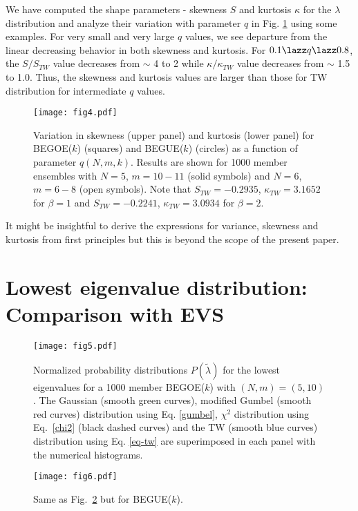 We have computed the shape parameters - skewness $S$ and kurtosis $\kappa$ for the $\lambda$ distribution and analyze their variation with parameter $q$ in Fig. \ref{fig4} using some examples. For very small and very large $q$ values, we see departure from the linear decreasing behavior in both skewness and kurtosis. For $0.1 \lazz q \lazz 0.8$, the $S/S_{TW}$ value decreases from $\sim$ 4 to 2 while $\kappa/\kappa_{TW}$ value decreases from $\sim$ 1.5 to 1.0. Thus, the skewness and kurtosis values are larger than those for TW distribution for intermediate $q$ values.

\begin{figure}[tbh]
	\begin{center}
			\texttt{[image: fig4.pdf]}
	\end{center}
	\caption{Variation in skewness (upper panel) and kurtosis (lower panel) for BEGOE($k$) (squares) and BEGUE($k$) (circles) as a function of parameter $q(N,m,k)$.  Results are shown for 1000 member ensembles with $N=5$, $m=10-11$ (solid symbols) and $N=6$, $m=6-8$ (open symbols).  Note that $S_{TW}=-0.2935$, $\kappa_{TW}=3.1652$ for $\beta=1$ and $S_{TW}=-0.2241$,  $\kappa_{TW}=3.0934$ for $\beta=2$.}
		\label{fig4}
\end{figure}

It might be insightful to derive the expressions for variance, skewness and kurtosis from first principles but this is beyond the scope of the present paper.

\section{Lowest eigenvalue distribution: Comparison with EVS}
\label{sec3}

\begin{figure}[tbh]
		\texttt{[image: fig5.pdf]}
	\caption{Normalized probability distributions $P({\tilde\lambda})$ for the lowest eigenvalues for a 1000 member BEGOE($k$) with $(N,m) = (5,10)$. The Gaussian (smooth green curves), modified Gumbel (smooth red curves) distribution using Eq. \eqref{gumbel}, $\chi^2$ distribution using Eq.~\eqref{chi2} (black dashed curves) and the TW (smooth blue curves) distribution using Eq. \eqref{eq-tw} are superimposed in each panel with the numerical histograms.}
	\label{fig5}
\end{figure}

\begin{figure}[tbh]
		\texttt{[image: fig6.pdf]}
	\caption{Same as Fig.~\ref{fig5} but for BEGUE($k$).}
	\label{fig6}
\end{figure}

